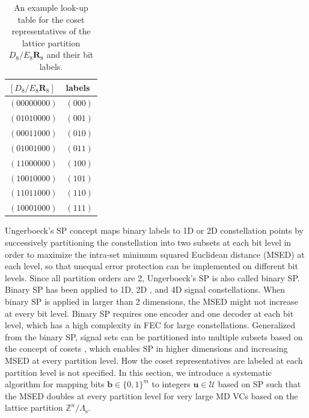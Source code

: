 \documentclass[journal]{IEEEtran}
\newcommand{\Z}{\mathbb{Z}}
\newcommand{\U}{\mathcal{U}}
\newcommand{\bb}{\boldsymbol{b}}
\newcommand{\bu}{\boldsymbol{u}}
\newcommand{\bR}{\boldsymbol{R}}
\newcommand{\Lambdas}{\Lambda_\mathrm{s}}
\begin{document}
\begin{table}[tbp]
  \renewcommand{\arraystretch}{1.2}
  \renewcommand{\tabcolsep}{12pt}
  \caption{An example look-up table for the coset representatives of the lattice partition $D_8/E_8\bR_8$ and their bit labels.}
  \label{tab:CosetRep}
  \centering
  \begin{tabular}{l l}
    \hline
    $[D_8/E_8\bR_8]$ & labels \\
    \hline \hline
    $(0 0 0 0 0 0 0 0)$ & $(0 0 0)$\\
    $(0 1 0 1 0 0 0 0)$ & $(0 0 1)$ \\
    $(0 0 0 1 1 0 0 0)$ & $(0 1 0)$ \\
    $(0 1 0 0 1 0 0 0)$ & $(0 1 1)$ \\
    $(1 1 0 0 0 0 0 0)$ & $(1 0 0)$ \\
    $(1 0 0 1 0 0 0 0)$ & $(1 0 1)$ \\
    $(1 1 0 1 1 0 0 0)$ & $(1 1 0)$ \\
    $(1 0 0 0 1 0 0 0)$ & $(1 1 1)$ \\
    \hline
  \end{tabular}
\end{table}
Ungerboeck's SP concept \cite{ungerboeck82} maps binary labels to 1D or 2D constellation points by successively partitioning the constellation into two subsets at each bit level in order to maximize the intra-set minimum squared Euclidean distance (MSED) at each level, so that unequal error protection can be implemented on different bit levels. Since all partition orders are 2, Ungerboeck's SP is also called binary SP. Binary SP has been applied to 1D, 2D \cite{wachsmann99,isaka98,yuan6g21}, and 4D \cite{beygi14jlt,frey20,stern20,stern21} signal constellations. When binary SP is applied in larger than 2 dimensions, the MSED might not increase at every bit level. Binary SP requires one encoder and one decoder at each bit level, which has a high complexity in FEC for large constellations. Generalized from the binary SP, signal sets can be partitioned into multiple subsets based on the concept of cosets \cite{calderbank87,forney88,forney89b,wei87}, which enables SP in higher dimensions \cite{wei87,forney88,forney89b} and increasing MSED at every partition level. How the coset representatives are labeled at each partition level is not specified. In this section, we introduce a systematic algorithm for mapping bits $\bb\in\{0,1\}^m$ to integers $\bu\in\U$ based on SP such that the MSED doubles at every partition level for very large MD VCs based on the lattice partition $\Z^n/\Lambdas$.
\end{document}
